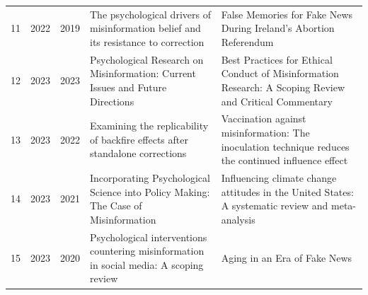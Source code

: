\begin{tabular}{lrrll}
11 & 2022 & 2019 & The psychological drivers of misinformation belief and its resistance to correction & False Memories for Fake News During Ireland’s Abortion Referendum \\
12 & 2023 & 2023 & Psychological Research on Misinformation: Current Issues and Future Directions & Best Practices for Ethical Conduct of Misinformation Research: A Scoping Review and Critical Commentary \\
13 & 2023 & 2022 & Examining the replicability of backfire effects after standalone corrections & Vaccination against misinformation: The inoculation technique reduces the continued influence effect \\
14 & 2023 & 2021 & Incorporating Psychological Science into Policy Making: The Case of Misinformation & Influencing climate change attitudes in the United States: A systematic review and meta-analysis \\
15 & 2023 & 2020 & Psychological interventions countering misinformation in social media: A scoping review & Aging in an Era of Fake News \\
\bottomrule
\end{tabular}
